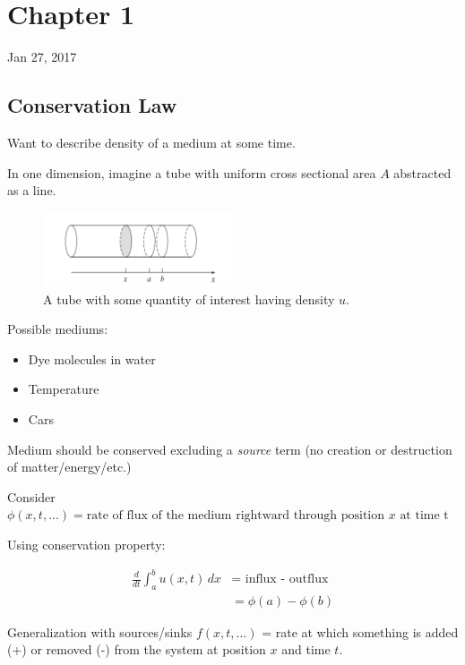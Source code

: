 \documentclass[main.tex]{subfiles}
\begin{document}
\section{Chapter 1}

\hrulefill

Jan 27, 2017

\vspace{3mm}

\subsection{Conservation Law}

Want to describe density of a medium at some time.

In one dimension, imagine a tube with uniform cross sectional area $A$ abstracted as a line.

\begin{figure}[ht]
        \centering
        \includegraphics[width=0.5\textwidth]{conservation-tube}
        \caption{A tube with some quantity of interest having density $u$.}
        \label{fig:conservation-tube}
\end{figure}

Possible mediums:
\begin{itemize}
    \item Dye molecules in water
    \item Temperature
    \item Cars
\end{itemize}

Medium should be conserved excluding a \textit{source} term (no creation or destruction of matter/energy/etc.)

Consider $\phi(x, t, ...) = \textrm{rate of flux of the medium rightward through position }x\textrm{ at time t}$

Using conservation property:

\begin{align}
\frac{d}{dt} \int_a^b u(x,t)\,dx &= \textrm{ influx - outflux} \\
                                 &= \phi(a) - \phi(b)
\end{align}

Generalization with sources/sinks $f(x, t, ...)$ = rate at which something is added (+) or removed (-) from the system at position $x$ and time $t$.
\end{document}
